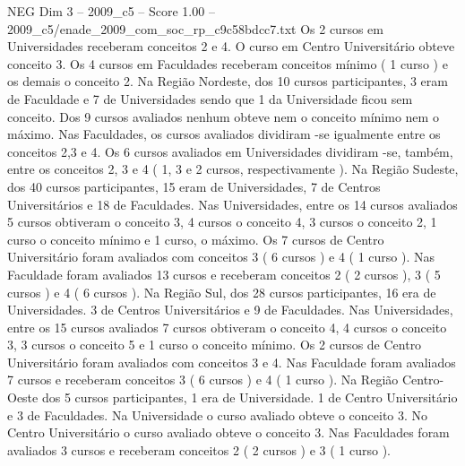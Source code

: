 \begin{textsample}{NEG Dim 3 – 2009\_c5 – Score 1.00 – 2009\_c5/enade\_2009\_com\_soc\_rp\_c9c58bdcc7.txt}
Os 2 cursos em Universidades receberam conceitos 2 e 4.
O curso em Centro Universitário obteve conceito 3.
Os 4 cursos em Faculdades receberam conceitos mínimo ( 1 curso ) e os demais o conceito 2.
Na Região Nordeste, dos 10 cursos participantes, 3 eram de Faculdade e 7 de Universidades sendo que 1 da Universidade ficou sem conceito.
Dos 9 cursos avaliados nenhum obteve nem o conceito mínimo nem o máximo.
Nas Faculdades, os cursos avaliados dividiram -se igualmente entre os conceitos 2,3 e 4.
Os 6 cursos avaliados em Universidades dividiram -se, também, entre os conceitos 2, 3 e 4 ( 1, 3 e 2 cursos, respectivamente ).
Na Região Sudeste, dos 40 cursos participantes, 15 eram de Universidades, 7 de Centros Universitários e 18 de Faculdades.
Nas Universidades, entre os 14 cursos avaliados 5 cursos obtiveram o conceito 3, 4 cursos o conceito 4, 3 cursos o conceito 2, 1 curso o conceito mínimo e 1 curso, o máximo.
Os 7 cursos de Centro Universitário foram avaliados com conceitos 3 ( 6 cursos ) e 4 ( 1 curso ).
Nas Faculdade foram avaliados 13 cursos e receberam conceitos 2 ( 2 cursos ), 3 ( 5 cursos ) e 4 ( 6 cursos ).
Na Região Sul, dos 28 cursos participantes, 16 era de Universidades. 3 de Centros Universitários e 9 de Faculdades.
Nas Universidades, entre os 15 cursos avaliados 7 cursos obtiveram o conceito 4, 4 cursos o conceito 3, 3 cursos o conceito 5 e 1 curso o conceito mínimo.
Os 2 cursos de Centro Universitário foram avaliados com conceitos 3 e 4.
Nas Faculdade foram avaliados 7 cursos e receberam conceitos 3 ( 6 cursos ) e 4 ( 1 curso ).
Na Região Centro-Oeste dos 5 cursos participantes, 1 era de Universidade. 1 de Centro Universitário e 3 de Faculdades.
Na Universidade o curso avaliado obteve o conceito 3.
No Centro Universitário o curso avaliado obteve o conceito 3.
Nas Faculdades foram avaliados 3 cursos e receberam conceitos 2 ( 2 cursos ) e 3 ( 1 curso ).

\end{textsample}
